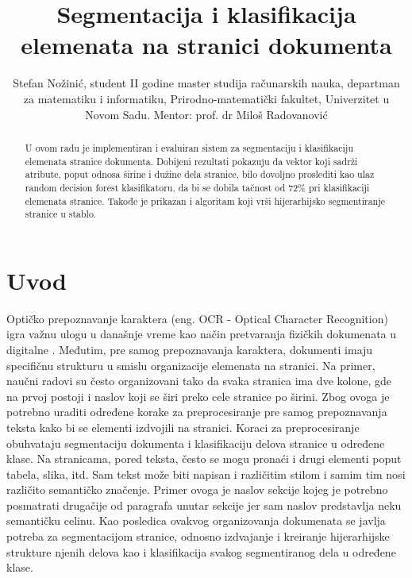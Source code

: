 \documentclass[]{amsart}
\begin{document}
\title{Segmentacija i klasifikacija elemenata na stranici dokumenta}
\author{Stefan Nožinić, student II godine master studija računarskih nauka, departman za matematiku i informatiku, Prirodno-matematički fakultet, Univerzitet u Novom Sadu. Mentor: \MakeLowercase{prof. dr} Miloš Radovanović}

\begin{abstract}
    U ovom radu je implementiran i evaluiran sistem za segmentaciju i klasifikaciju elemenata stranice dokumenta. 
	Dobijeni rezultati pokazuju da vektor koji sadrži atribute, poput odnosa širine i 
	dužine dela stranice, bilo dovoljno proslediti kao ulaz random decision
    forest klasifikatoru, da bi se dobila tačnost od 72\% pri klasifikaciji elemenata stranice. 
	Takođe je prikazan i algoritam koji vrši hijerarhijsko segmentiranje stranice u stablo.     
\end{abstract}


\maketitle



\section{Uvod}
\label{sec:org8295245}

Optičko prepoznavanje karaktera (eng. OCR - Optical Character Recognition) igra važnu ulogu u današnje vreme kao način pretvaranja fizičkih dokumenata u digitalne \cite{mori1999optical}.
Međutim, pre samog prepoznavanja karaktera, dokumenti imaju specifičnu strukturu u smislu organizacije elemenata na stranici. Na primer, naučni radovi su često
organizovani tako da svaka stranica ima dve kolone, gde na prvoj postoji i naslov koji se širi preko cele stranice po širini. Zbog ovoga je potrebno uraditi određene korake za preprocesiranje
pre samog prepoznavanja teksta kako bi se elementi izdvojili na stranici. Koraci za preprocesiranje obuhvataju segmentaciju dokumenta i klasifikaciju delova stranice u određene klase. 
Na stranicama, pored teksta, često se mogu pronaći i drugi elementi poput tabela, slika, itd.
Sam tekst može biti napisan i različitim stilom i samim tim nosi različito semantičko značenje. Primer ovoga je naslov sekcije kojeg je potrebno posmatrati
drugačije od paragrafa unutar sekcije jer sam naslov predstavlja neku semantičku celinu. 
Kao posledica ovakvog organizovanja dokumenata se javlja potreba za segmentacijom stranice, odnosno izdvajanje i kreiranje hijerarhijske strukture njenih delova kao i
klasifikacija svakog segmentiranog dela u određene klase.
\end{document}
